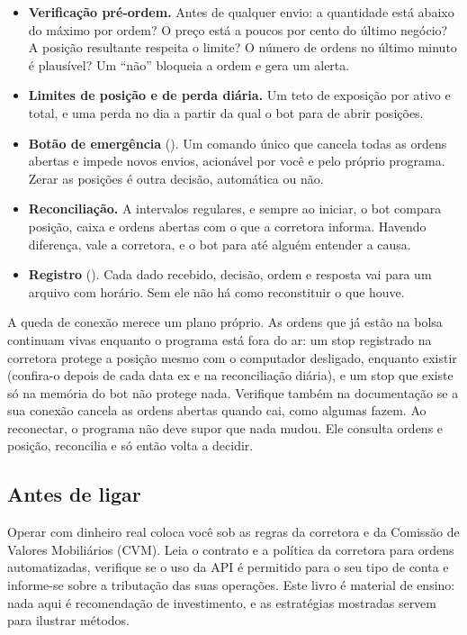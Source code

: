 \begin{itemize}
  \item \textbf{Verificação pré-ordem.} Antes de qualquer envio: a quantidade está abaixo do máximo por ordem? O preço está a poucos por cento do último negócio? A posição resultante respeita o limite? O número de ordens no último minuto é plausível? Um ``não'' bloqueia a ordem e gera um alerta.
  \item \textbf{Limites de posição e de perda diária.} Um teto de exposição por ativo e total, e uma perda no dia a partir da qual o bot para de abrir posições.
  \item \textbf{Botão de emergência} (). Um comando único que cancela todas as ordens abertas e impede novos envios, acionável por você e pelo próprio programa. Zerar as posições é outra decisão, automática ou não.
  \item \textbf{Reconciliação.} A intervalos regulares, e sempre ao iniciar, o bot compara posição, caixa e ordens abertas com o que a corretora informa. Havendo diferença, vale a corretora, e o bot para até alguém entender a causa.
  \item \textbf{Registro} (). Cada dado recebido, decisão, ordem e resposta vai para um arquivo com horário. Sem ele não há como reconstituir o que houve.
\end{itemize}

A queda de conexão merece um plano próprio. As ordens que já estão na bolsa continuam vivas enquanto o programa está fora do ar: um stop registrado na corretora protege a posição mesmo com o computador desligado, enquanto existir (confira-o depois de cada data ex e na reconciliação diária), e um stop que existe só na memória do bot não protege nada. Verifique também na documentação se a sua conexão cancela as ordens abertas quando cai, como algumas fazem. Ao reconectar, o programa não deve supor que nada mudou. Ele consulta ordens e posição, reconcilia e só então volta a decidir.

\subsection{Antes de ligar}

Operar com dinheiro real coloca você sob as regras da corretora e da Comissão de Valores Mobiliários (CVM). Leia o contrato e a política da corretora para ordens automatizadas, verifique se o uso da API é permitido para o seu tipo de conta e informe-se sobre a tributação das suas operações. Este livro é material de ensino: nada aqui é recomendação de investimento, e as estratégias mostradas servem para ilustrar métodos.


